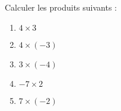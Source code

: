 
\begin{exercice}\label{exosmath-0743}

    Calculer les produits suivants :
    \begin{enumerate}
        \item
            \( 4\times 3\)
        \item
            \( 4\times (-3)\)
        \item
            \( 3\times (-4)\)
        \item
            \( -7\times 2\)
        \item
            \( 7\times (-2)\)
    \end{enumerate}
    
\end{exercice}

